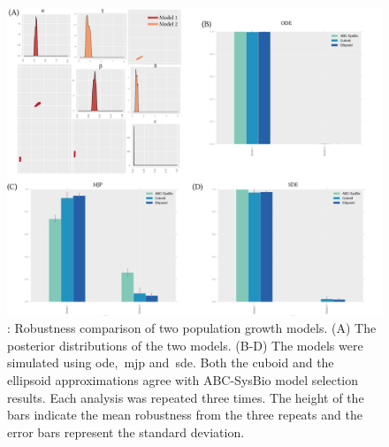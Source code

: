 \begin{figure}[p]
\begin{center}
\includegraphics[width=\textwidth]{../../chapters/chapterStabilityFinder/images/Example4_summ.png}
\caption[Robustness analysis of case study 2]{\label{fig:rob_sysbio4}: Robustness comparison of two population growth models. (A) The posterior distributions of the two models. (B-D) The models were simulated using \acrshort{ode},~\acrshort{mjp} and~\acrshort{sde}. Both the cuboid and the ellipsoid approximations agree with ABC-SysBio model selection results. Each analysis was repeated three times. The height of the bars indicate the mean robustness from the three repeats and the error bars represent the standard deviation. }
\end{center}
\end{figure}

\clearpage


